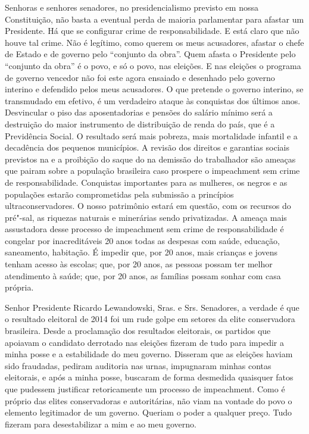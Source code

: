 Senhoras e
senhores senadores, no presidencialismo previsto em nossa Constituição,
não basta a eventual perda de maioria parlamentar para afastar um
Presidente. Há que se configurar crime de responsabilidade. E está claro
que não houve tal crime. Não é legítimo, como querem os meus acusadores,
afastar o chefe de Estado e de governo pelo ``conjunto da obra''. Quem
afasta o Presidente pelo ``conjunto da obra'' é o povo, e só o povo, nas
eleições. E nas eleições o programa de governo vencedor não foi este
agora ensaiado e desenhado pelo governo interino e defendido pelos meus
acusadores. O que pretende o governo interino, se transmudado em
efetivo, é um verdadeiro ataque às conquistas dos últimos anos.
Desvincular o piso das aposentadorias e pensões do salário mínimo será a
destruição do maior instrumento de distribuição de renda do país, que é
a Previdência Social. O resultado será mais pobreza, mais mortalidade
infantil e a decadência dos pequenos municípios. A revisão dos direitos
e garantias sociais previstos na  e a proibição do saque do  na
demissão do trabalhador são ameaças que pairam sobre a população
brasileira caso prospere o impeachment sem crime de responsabilidade.
Conquistas importantes para as mulheres, os negros e as populações 
estarão comprometidas pela submissão a princípios ultraconservadores. O
nosso patrimônio estará em questão, com os recursos do pré"-sal, as
riquezas naturais e minerárias sendo privatizadas. A ameaça mais
assustadora desse processo de impeachment sem crime de responsabilidade
é congelar por inacreditáveis 20 anos todas as despesas com saúde,
educação, saneamento, habitação. É impedir que, por 20 anos, mais
crianças e jovens tenham acesso às escolas; que, por 20 anos, as pessoas
possam ter melhor atendimento à saúde; que, por 20 anos, as famílias
possam sonhar com casa própria.

Senhor Presidente Ricardo Lewandowski,
Sras. e Srs. Senadores, a verdade é que o resultado eleitoral de 2014
foi um rude golpe em setores da elite conservadora brasileira. Desde a
proclamação dos resultados eleitorais, os partidos que apoiavam o
candidato derrotado nas eleições fizeram de tudo para impedir a minha
posse e a estabilidade do meu governo. Disseram que as eleições haviam
sido fraudadas, pediram auditoria nas urnas, impugnaram minhas contas
eleitorais, e após a minha posse, buscaram de forma desmedida quaisquer
fatos que pudessem justificar retoricamente um processo de impeachment.
Como é próprio das elites conservadoras e autoritárias, não viam na
vontade do povo o elemento legitimador de um governo. Queriam o poder a
qualquer preço. Tudo fizeram para desestabilizar a mim e ao meu governo.

